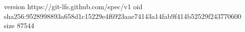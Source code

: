 version https://git-lfs.github.com/spec/v1
oid sha256:9528998893a658d1c15229e4f6923aae74143a14fab9f414b52529f243770600
size 87544
